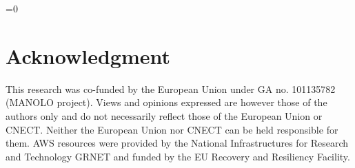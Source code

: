 \documentclass[conference]{IEEEtran}
\def\anon{0}
\begin{document}
\ifnum\anon=0

\section*{Acknowledgment}

This research was co-funded by the European Union under GA no. 101135782 (MANOLO project). Views and opinions expressed are however those of the authors only and do not necessarily reflect those of the European Union or CNECT. Neither the European Union nor CNECT can be held responsible for them. AWS resources were provided by the National Infrastructures for Research and Technology GRNET and funded by the EU Recovery and Resiliency Facility.

\fi




\end{document}
